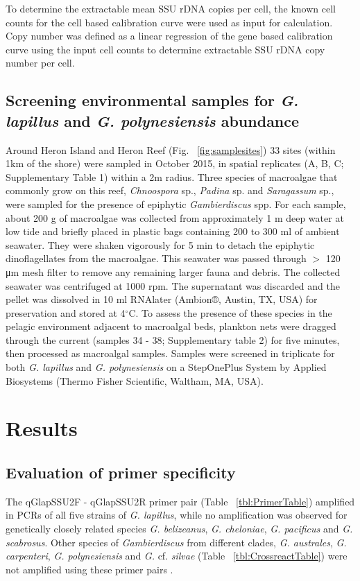 \documentclass[12pt]{article}
\begin{document}
To determine the extractable mean SSU rDNA copies per cell, the known cell counts for the cell based calibration curve were used as input for calculation. Copy number was defined as a linear regression of the gene based calibration curve using the input cell counts to determine extractable SSU rDNA copy number per cell.

\subsection*{Screening environmental samples for \emph{G. lapillus} and \emph{G. polynesiensis} abundance}
Around Heron Island and Heron Reef (Fig. ~\ref{fig:samplesites}) 33 sites (within 1km of the shore) were sampled in October 2015, in spatial replicates (A, B, C; Supplementary Table 1) within a 2m radius. Three species of macroalgae that commonly grow on this reef, \textit{Chnoospora} sp., \textit{Padina} sp. and \textit{Saragassum} sp., were sampled for the presence of epiphytic \emph{Gambierdiscus} spp. For each sample, about 200 g of macroalgae was collected from approximately 1 m deep water at low tide and briefly placed in plastic bags containing 200 to 300 ml of ambient seawater. They were shaken vigorously for 5 min to detach the epiphytic dinoflagellates from the macroalgae. This seawater was passed through $>$ 120 μm mesh filter to remove any remaining larger fauna and debris. The collected seawater was centrifuged at 1000 rpm. The supernatant was discarded and the pellet was dissolved in 10 ml RNAlater (Ambion®, Austin, TX, USA) for preservation and stored at 4$^{\circ}$C.
To assess the presence of these species in the pelagic environment adjacent to macroalgal beds, plankton nets were dragged through the current (samples 34 - 38; Supplementary table 2) for five minutes, then processed as macroalgal samples.
Samples were screened in triplicate for both \emph{G. lapillus} and \emph{G. polynesiensis} on a StepOnePlus System by Applied Biosystems (Thermo Fisher Scientific, Waltham, MA, USA).



\newpage
\section*{Results}
\subsection*{Evaluation of primer specificity}
The qGlapSSU2F - qGlapSSU2R primer pair (Table ~\ref{tbl:PrimerTable}) amplified in PCRs of all five strains of \emph{G. lapillus}, while no amplification was observed for genetically closely related species \emph{G. belizeanus}, \emph{G. cheloniae}, \emph{G. pacificus} and \emph{G. scabrosus}. Other species of \emph{Gambierdiscus} from different clades, \emph{G. australes}, \emph{G. carpenteri}, \emph{G. polynesiensis} and \emph{G.} cf. \emph{silvae} (Table ~\ref{tbl:CrossreactTable}) were not amplified using these primer pairs \citep{smith2016new,kretzschmar2016characterization}.
\end{document}
